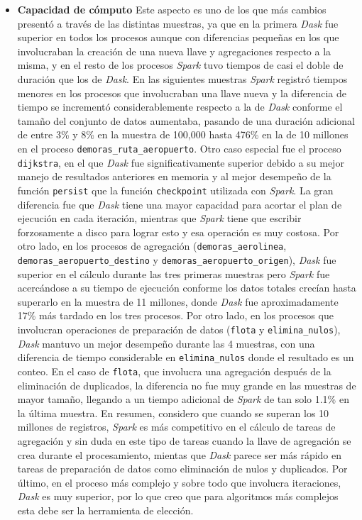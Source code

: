 \begin{itemize}
	\item \textbf{Capacidad de cómputo} Este aspecto es uno de los que más cambios presentó a través de las distintas muestras, ya que en la primera \textit{Dask} fue superior en todos los procesos aunque con diferencias pequeñas en los que involucraban la creación de una nueva llave y agregaciones respecto a la misma, y en el resto de los procesos \textit{Spark} tuvo tiempos de casi el doble de duración que los de \textit{Dask}. En las siguientes muestras \textit{Spark} registró tiempos menores en los procesos que involucraban una llave nueva y la diferencia de tiempo se incrementó considerablemente respecto a la de \textit{Dask} conforme el tamaño del conjunto de datos aumentaba, pasando de una duración adicional de entre 3\% y 8\% en la muestra de 100,000 hasta 476\% en la de 10 millones en el proceso \texttt{demoras\_ruta\_aeropuerto}. Otro caso especial fue el proceso \texttt{dijkstra}, en el que \textit{Dask} fue significativamente superior debido a su mejor manejo de resultados anteriores en memoria y al mejor desempeño de la función \texttt{persist} que la función \texttt{checkpoint} utilizada con \textit{Spark}. La gran diferencia fue que \textit{Dask} tiene una mayor capacidad para acortar el plan de ejecución en cada iteración, mientras que \textit{Spark} tiene que escribir forzosamente a disco para lograr esto y esa operación es muy costosa. Por otro lado, en los procesos de agregación (\texttt{demoras\_aerolinea}, \texttt{demoras\_aeropuerto\_destino} y \texttt{demoras\_aeropuerto\_origen}), \textit{Dask} fue superior en el cálculo durante las tres primeras muestras pero \textit{Spark} fue acercándose a su tiempo de ejecución conforme los datos totales crecían hasta superarlo en la muestra de 11 millones, donde \textit{Dask} fue aproximadamente 17\% más tardado en los tres procesos. Por otro lado, en los procesos que involucran operaciones de preparación de datos (\texttt{flota} y \texttt{elimina\_nulos}), \textit{Dask} mantuvo un mejor desempeño durante las 4 muestras, con una diferencia de tiempo considerable en \texttt{elimina\_nulos} donde el resultado es un conteo. En el caso de \texttt{flota}, que involucra una agregación después de la eliminación de duplicados, la diferencia no fue muy grande en las muestras de mayor tamaño, llegando a un tiempo adicional de \textit{Spark} de tan solo 1.1\% en la última muestra. En resumen, considero que cuando se superan los 10 millones de registros, \textit{Spark} es más competitivo en el cálculo de tareas de agregación y sin duda en este tipo de tareas cuando la llave de agregación se crea durante el procesamiento, mientas que \textit{Dask} parece ser más rápido en tareas de preparación de datos como eliminación de nulos y duplicados. Por último, en el proceso más complejo y sobre todo que involucra iteraciones, \textit{Dask} es muy superior, por lo que creo que para algoritmos más complejos esta debe ser la herramienta de elección.
	

\end{itemize}
